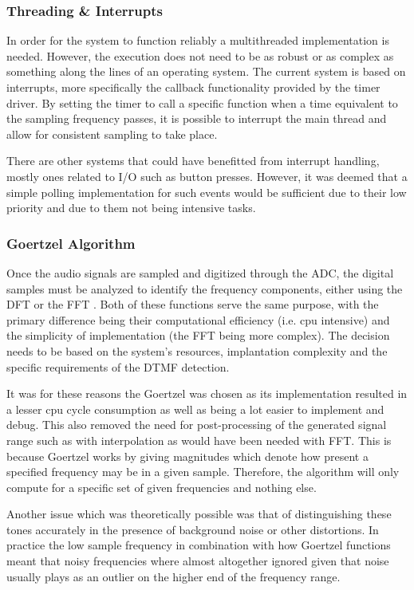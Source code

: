 \documentclass{cce2014-design}
\begin{document}
\subsubsection{Threading \& Interrupts}
In order for the system to function reliably a multithreaded implementation 
is needed. However, the execution does not need to be as robust or as complex
as something along the lines of an operating system. The current system is
based on interrupts, more specifically the callback functionality provided by
the timer driver. By setting the timer to call a specific function when a time
equivalent to the sampling frequency passes, it is possible to interrupt the
main thread and allow for consistent sampling to take place.

There are other systems that could have benefitted from interrupt handling, mostly
ones related to I/O such as button presses. However, it was deemed that a simple
polling implementation for such events would be sufficient due to their low priority
and due to them not being intensive tasks.

\subsubsection{Goertzel Algorithm}
Once the audio signals are sampled and digitized through the ADC, the digital
samples must be analyzed to identify the frequency components, either using the
DFT \cite{goertzel} or the FFT \cite{fft}. Both of these functions serve
the same purpose, with the primary difference being their computational
efficiency (i.e. cpu intensive) and the simplicity of implementation (the FFT 
being more complex). The decision needs to be based on the system's resources,
implantation complexity and the specific requirements of the DTMF detection.

It was for these reasons the Goertzel was chosen as its implementation 
resulted in a lesser cpu cycle consumption as well as being a lot easier to
implement and debug. This also removed the need for post-processing of the 
generated signal range such as with interpolation as would have been needed
with FFT. This is because Goertzel works by giving magnitudes which denote
how present a specified frequency may be in a given sample. Therefore, the
algorithm will only compute for a specific set of given frequencies and nothing
else.

Another issue which was theoretically possible was that of distinguishing these
tones accurately in the presence of background noise or other distortions. In 
practice the low sample frequency in combination with how Goertzel functions
meant that noisy frequencies where almost altogether ignored given that noise
usually plays as an outlier on the higher end of the frequency range.
\end{document}
